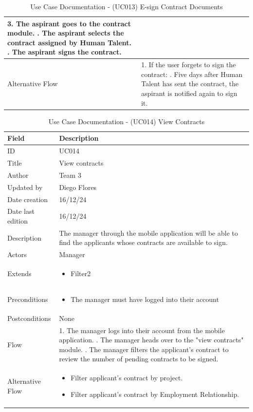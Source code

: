 \documentclass{scrreprt}
\begin{document}
\begin{table}[H]
\begin{tabular}{|p{3cm}|p{10cm}|}
		3. The aspirant goes to the contract module. \newline
		4. The aspirant selects the contract assigned by Human Talent. \newline
		5. The aspirant signs the contract. \\ \hline
		Alternative Flow & 
		1. If the user forgets to sign the contract: \newline
		2. Five days after Human Talent has sent the contract, the aspirant is notified again to sign it. \\ \hline
	\end{tabular}
	\caption{Use Case Documentation - (UC013) E-sign Contract Documents}
	\label{table:UC013}
\end{table}

\begin{table}[H]
	\centering
	\begin{tabular}{|p{3cm}|p{10cm}|}
		\hline
		\textbf{Field} & \textbf{Description} \\ \hline
		ID & UC014 \\ \hline
		Title & View contracts \\ \hline
		Author & Team 3 \\ \hline
		Updated by & Diego Flores \\ \hline
		Date creation & 16/12/24 \\ \hline
		Date last edition & 16/12/24 \\ \hline
		Description & 
		The manager through the mobile application will be able to find the applicants whose contracts are available to sign. \\ \hline
		Actors & Manager \\ \hline
		Extends & 
		\begin{itemize}
			\item Filter2
		\end{itemize} \\ \hline
		Preconditions & 
		\begin{itemize}
			\item The manager must have logged into their account
		\end{itemize} \\ \hline
		Postconditions & 
		None \\ \hline
		Flow & 
		1. The manager logs into their account from the mobile application. \newline
		2. The manager heads over to the "view contracts" module. \newline
		3. The manager filters the applicant's contract to review the number of pending contracts to be signed. \\ \hline
		Alternative Flow & 
		\begin{itemize}
			\item Filter applicant's contract by project.
			\item Filter applicant's contract by Employment Relationship.
		\end{itemize} \\ \hline
	\end{tabular}
	\caption{Use Case Documentation - (UC014) View Contracts}
	\label{table:UC014}
\end{table}
\end{document}
